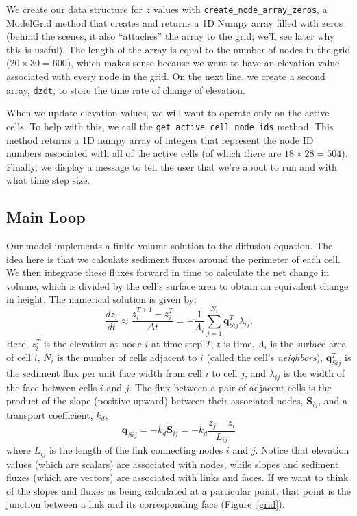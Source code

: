 \documentclass[12pt]{article}
\newcommand{\code}[1]{{\tt #1}}
\begin{document}
We create our data structure for $z$ values with  \code{create\_node\_array\_zeros}, a ModelGrid method that creates and returns a 1D Numpy array filled with zeros (behind the scenes, it also ``attaches'' the array to the grid; we'll see later why this is useful). The length of the array is equal to the number of nodes in the grid ($20\times 30=600$), which makes sense because we want to have an elevation value associated with every node in the grid.
On the next line, we create a second array, \code{dzdt}, to store the time rate of change of elevation. 

When we update elevation values, we will want to operate only on the active cells. To help with this, we call the \code{get\_active\_cell\_node\_ids} method. This method returns a 1D numpy array of integers that represent the node ID numbers associated with all of the active cells (of which there are $18\times 28 = 504$). Finally, we display a message to tell the user that we're about to run and with what time step size.


\subsection{Main Loop}

Our model implements a finite-volume solution to the diffusion equation. The idea here is that we calculate sediment fluxes around the perimeter of each cell. We then integrate these fluxes forward in time to calculate the net change in volume, which is divided by the cell's surface area to obtain an equivalent change in height. The numerical solution is given by:
\begin{equation}
\frac{d z_i}{dt} \approx \frac{z^{T+1}_i-z^T_i}{\Delta t}
= - \frac{1}{\Lambda_i} \sum_{j=1}^{N_i} \mathbf{q}_{Sij}^T \lambda_{ij}.
\label{eq:dzdt}
\end{equation}
Here, $z_i^T$ is the elevation at node $i$ at time step $T$, $t$ is time, $\Lambda_i$ is the surface area of cell $i$, $N_i$ is the number of cells adjacent to $i$ (called the cell's {\em neighbors}), $\mathbf{q}_{Sij}^T$ is the sediment flux per unit face width from cell $i$ to cell $j$, and $\lambda_{ij}$ is the width of the face between cells $i$ and $j$. The flux between a pair of adjacent cells is the product of the slope (positive upward) between their associated nodes, $\mathbf{S}_{ij}$, and a transport coefficient, $k_d$,
\begin{equation}
\mathbf{q}_{Sij} = - k_d \mathbf{S}_{ij} = - k_d \frac{z_j-z_i}{L_{ij}}
\end{equation}
where $L_{ij}$ is the length of the link connecting nodes $i$ and $j$. Notice that elevation values (which are scalars) are associated with nodes, while slopes and sediment fluxes (which are vectors) are associated with links and faces. If we want to think of the slopes and fluxes as being calculated at a particular point, that point is the junction between a link and its corresponding face (Figure~\ref{grid}).
\end{document}
